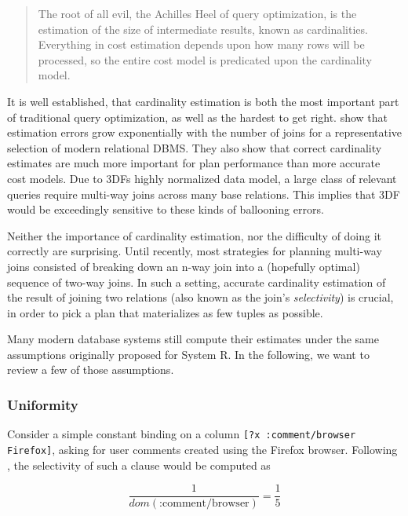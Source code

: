 \documentclass[../index.tex]{subfiles}
\begin{document}
\begin{quote}
The root of all evil, the Achilles Heel of query optimization, is the
estimation of the size of intermediate results, known as
cardinalities. Everything in cost estimation depends upon how many
rows will be processed, so the entire cost model is predicated upon
the cardinality model.

\cite{lohman2014query}
\end{quote}

It is well established, that cardinality estimation is both the most
important part of traditional query optimization, as well as the
hardest to get right. \cite{leis2015good} show that estimation errors
grow exponentially with the number of joins for a representative
selection of modern relational DBMS. They also show that correct
cardinality estimates are much more important for plan performance
than more accurate cost models. Due to 3DFs highly normalized data
model, a large class of relevant queries require multi-way joins
across many base relations. This implies that 3DF would be exceedingly
sensitive to these kinds of ballooning errors.

Neither the importance of cardinality estimation, nor the difficulty
of doing it correctly are surprising. Until recently, most strategies
for planning multi-way joins consisted of breaking down an n-way join
into a (hopefully optimal) sequence of two-way joins. In such a
setting, accurate cardinality estimation of the result of joining two
relations (also known as the join's \emph{selectivity}) is crucial, in
order to pick a plan that materializes as few tuples as possible.

Many modern database systems still compute their estimates under the
same assumptions originally proposed for System R. In the following,
we want to review a few of those assumptions.

\subsubsection{Uniformity}

Consider a simple constant binding on a column \texttt{[?x
    :comment/browser Firefox]}, asking for user comments created using
the Firefox browser. Following \cite{selinger1979access}, the
selectivity of such a clause would be computed as

\begin{equation}
  \dfrac{1}{dom(\text{:comment/browser})} = \dfrac{1}{5}
\end{equation}
\end{document}
